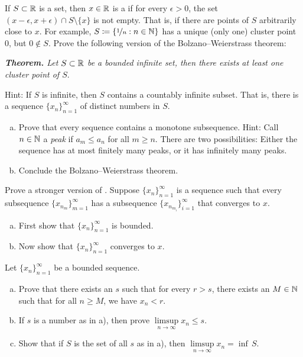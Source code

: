 \begin{exercise}
If $S \subset {\mathbb{R}}$ is a set, then $x \in {\mathbb{R}}$ is a \emph{}
if for every $\epsilon > 0$, the set $(x-\epsilon,x+\epsilon) \cap S
\setminus \{ x \}$ is not empty.  That is, if there are points of $S$
arbitrarily close to $x$.
For example, $S \coloneqq \{ \nicefrac{1}{n} : n \in {\mathbb{N}} \}$ has a unique (only
one) cluster point $0$, but $0 \notin S$.
Prove the following version of the Bolzano--Weierstrass theorem:

\medskip

\noindent
\emph{\textbf{Theorem.} Let $S \subset {\mathbb{R}}$ be a bounded infinite set,
then there exists at least one cluster point of $S$}.

\medskip

Hint: If $S$ is infinite, then $S$ contains a countably infinite subset.
That is, there is a sequence $\{ x_n \}_{n=1}^\infty$ of distinct numbers in $S$.
\end{exercise}

\begin{samepage}
\begin{exercise}[Challenging]
\leavevmode
\begin{enumerate}[a)]
\item
Prove that every sequence contains a monotone subsequence.
Hint: Call $n \in {\mathbb{N}}$ a \emph{peak} if $a_m \leq a_n$ for all $m \geq n$.
There are two possibilities: Either the sequence has at most finitely many
peaks,
or it has infinitely many peaks.
\item
Conclude the Bolzano--Weierstrass theorem.
\end{enumerate}
\end{exercise}
\end{samepage}

\begin{exercise}
\pagebreak[2]
Prove a stronger version of .
Suppose $\{ x_n \}_{n=1}^\infty$ is a sequence such that every subsequence
$\{ x_{n_m} \}_{m=1}^\infty$ has a subsequence
$\{ x_{n_{m_i}} \}_{i=1}^\infty$ that converges to $x$.
\begin{enumerate}[a)]
\item
First show that $\{ x_n \}_{n=1}^\infty$ is
bounded.
\item
Now show that $\{ x_n \}_{n=1}^\infty$ converges to $x$.
\end{enumerate}
\end{exercise}

\begin{exercise}
Let $\{x_n\}_{n=1}^\infty$ be a bounded sequence.
\begin{enumerate}[a)]
\item
Prove that there exists an $s$ such that for every $r > s$, there exists 
an $M \in {\mathbb{N}}$ such that for all $n \geq M$, we have
$x_n < r$.
\item
If $s$ is a number as in a), then prove $\limsup\limits_{n\to\infty} x_n \leq s$.
\item
Show that if $S$ is the set of all $s$ as in a), then
$\limsup\limits_{n\to\infty} x_n = \inf \, S$.
\end{enumerate}
\end{exercise}

